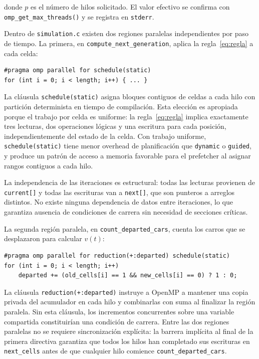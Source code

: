 donde $p$ es el número de hilos solicitado. El valor efectivo se confirma
con \texttt{omp\_get\_max\_threads()} y se registra en \texttt{stderr}.

Dentro de \texttt{simulation.c} existen dos regiones paralelas
independientes por paso de tiempo. La primera, en
\texttt{compute\_next\_generation}, aplica la regla~\eqref{eq:regla} a
cada celda:

\begin{center}
\begin{verbatim}
#pragma omp parallel for schedule(static)
for (int i = 0; i < length; i++) { ... }
\end{verbatim}
\end{center}

La cláusula \texttt{schedule(static)} asigna bloques contiguos de celdas
a cada hilo con partición determinista en tiempo de compilación. Esta
elección es apropiada porque el trabajo por celda es uniforme: la
regla~\eqref{eq:regla} implica exactamente tres lecturas, dos operaciones
lógicas y una escritura para cada posición, independientemente del estado
de la celda. Con trabajo uniforme, \texttt{schedule(static)} tiene menor
overhead de planificación que \texttt{dynamic} o \texttt{guided}, y
produce un patrón de acceso a memoria favorable para el prefetcher al
asignar rangos contiguos a cada hilo.

La independencia de las iteraciones es estructural: todas las lecturas
provienen de \texttt{current[]} y todas las escrituras van a
\texttt{next[]}, que son punteros a arreglos distintos. No existe ninguna
dependencia de datos entre iteraciones, lo que garantiza ausencia de
condiciones de carrera sin necesidad de secciones críticas.

La segunda región paralela, en \texttt{count\_departed\_cars}, cuenta los
carros que se desplazaron para calcular $v(t)$:

\begin{center}
\begin{verbatim}
#pragma omp parallel for reduction(+:departed) schedule(static)
for (int i = 0; i < length; i++)
    departed += (old_cells[i] == 1 && new_cells[i] == 0) ? 1 : 0;
\end{verbatim}
\end{center}

La cláusula \texttt{reduction(+:departed)} instruye a OpenMP a mantener
una copia privada del acumulador en cada hilo y combinarlas con suma al
finalizar la región paralela. Sin esta cláusula, los incrementos
concurrentes sobre una variable compartida constituirían una condición de
carrera. Entre las dos regiones paralelas no se requiere sincronización
explícita: la barrera implícita al final de la primera directiva garantiza
que todos los hilos han completado sus escrituras en \texttt{next\_cells}
antes de que cualquier hilo comience \texttt{count\_departed\_cars}.

